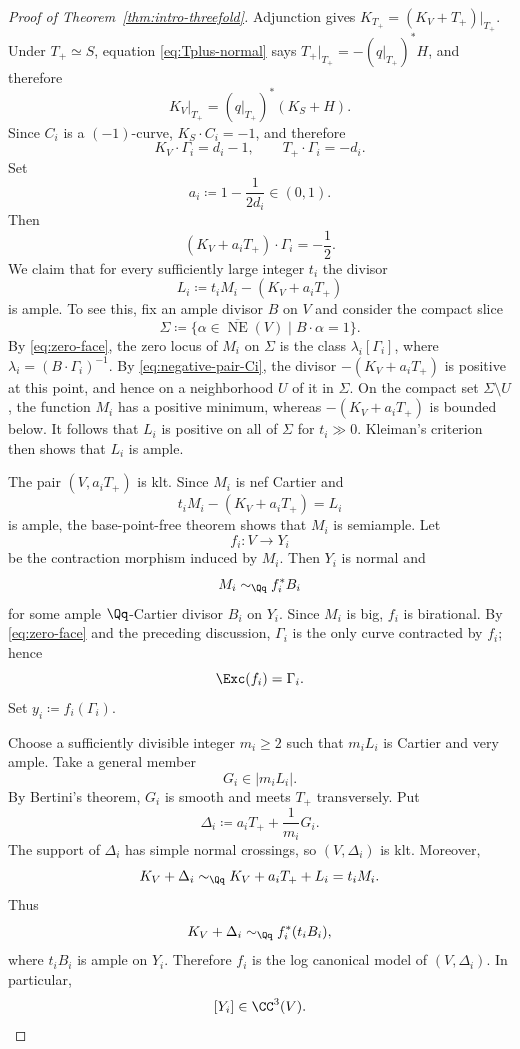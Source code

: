 \documentclass[12pt]{amsart}
\newcommand{\NE}{\overline{\operatorname{NE}}}
\begin{document}
\begin{proof}[Proof of Theorem~\ref{thm:intro-threefold}]
Adjunction gives $K_{T_+}=(K_V+T_+)|_{T_+}$. Under $T_+\simeq S$, equation \eqref{eq:Tplus-normal} says $T_+|_{T_+}=-(q|_{T_+})^*H$, and therefore
\[
 K_V|_{T_+}=(q|_{T_+})^*(K_S+H).
\]
Since $C_i$ is a $(-1)$-curve, $K_S\cdot C_i=-1$, and therefore
\[
 K_V\cdot\Gamma_i=d_i-1,
 \qquad
 T_+\cdot\Gamma_i=-d_i.
\]
Set
\[
 a_i\coloneqq1-\frac{1}{2d_i}\in(0,1).
\]
Then
\begin{equation}\label{eq:negative-pair-Ci}
 (K_V+a_iT_+)\cdot\Gamma_i=-\frac12.
\end{equation}
We claim that for every sufficiently large integer $t_i$ the divisor
\begin{equation}\label{eq:Li}
 L_i\coloneqq t_iM_i-(K_V+a_iT_+)
\end{equation}
is ample. To see this, fix an ample divisor $B$ on $V$ and consider the compact slice
\[
 \Sigma\coloneqq\{\alpha\in\NE(V)\mid B\cdot\alpha=1\}.
\]
By \eqref{eq:zero-face}, the zero locus of $M_i$ on $\Sigma$ is the class $\lambda_i[\Gamma_i]$, where $\lambda_i=(B\cdot\Gamma_i)^{-1}$. By \eqref{eq:negative-pair-Ci}, the divisor $-(K_V+a_iT_+)$ is positive at this point, and hence on a neighborhood $U$ of it in $\Sigma$. On the compact set $\Sigma\setminus U$, the function $M_i$ has a positive minimum, whereas $-(K_V+a_iT_+)$ is bounded below. It follows that $L_i$ is positive on all of $\Sigma$ for $t_i\gg0$. Kleiman's criterion then shows that $L_i$ is ample.

The pair $(V,a_iT_+)$ is klt. Since $M_i$ is nef Cartier and
\[
 t_iM_i-(K_V+a_iT_+)=L_i
\]
is ample, the base-point-free theorem \cite[Theorem~3.3]{KM98} shows that $M_i$ is semiample. Let
\[
 f_i\colon V\to Y_i
\]
be the contraction morphism induced by $M_i$. Then $Y_i$ is normal and
\[
 M_i\sim_{\Qq}f_i^*B_i
\]
for some ample $\Qq$-Cartier divisor $B_i$ on $Y_i$. Since $M_i$ is big,
$f_i$ is birational. By \eqref{eq:zero-face} and the preceding discussion,
$\Gamma_i$ is the only curve contracted by $f_i$; hence
\begin{equation}\label{eq:exceptional-locus-fi}
 \Exc(f_i)=\Gamma_i.
\end{equation}
Set $y_i\coloneqq f_i(\Gamma_i)$.

Choose a sufficiently divisible integer $m_i\geq2$ such that $m_iL_i$ is Cartier and very ample. Take a general member
\[
 G_i\in|m_iL_i|.
\]
By Bertini's theorem, $G_i$ is smooth and meets $T_+$ transversely. Put
\[
 \Delta_i\coloneqq a_iT_++\frac1{m_i}G_i.
\]
The support of $\Delta_i$ has simple normal crossings, so $(V,\Delta_i)$ is klt. Moreover,
\[
 K_V+\Delta_i
 \sim_{\Qq}
 K_V+a_iT_++L_i
 =t_iM_i.
\]
Thus
\[
 K_V+\Delta_i\sim_{\Qq}f_i^*(t_iB_i),
\]
where $t_iB_i$ is ample on $Y_i$. Therefore $f_i$ is the log canonical model of $(V,\Delta_i)$. In particular,
\[
 [Y_i]\in\CC^3(V).
\]


\end{proof}
\end{document}
